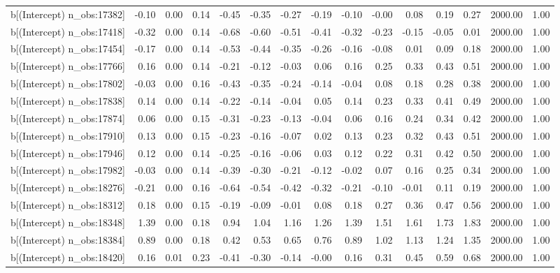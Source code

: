\begin{table}[ht]
\begin{tabular}{rrrrrrrrrrrrrrr}
  b[(Intercept) n\_obs:17382] & -0.10 & 0.00 & 0.14 & -0.45 & -0.35 & -0.27 & -0.19 & -0.10 & -0.00 & 0.08 & 0.19 & 0.27 & 2000.00 & 1.00 \\ 
  b[(Intercept) n\_obs:17418] & -0.32 & 0.00 & 0.14 & -0.68 & -0.60 & -0.51 & -0.41 & -0.32 & -0.23 & -0.15 & -0.05 & 0.01 & 2000.00 & 1.00 \\ 
  b[(Intercept) n\_obs:17454] & -0.17 & 0.00 & 0.14 & -0.53 & -0.44 & -0.35 & -0.26 & -0.16 & -0.08 & 0.01 & 0.09 & 0.18 & 2000.00 & 1.00 \\ 
  b[(Intercept) n\_obs:17766] & 0.16 & 0.00 & 0.14 & -0.21 & -0.12 & -0.03 & 0.06 & 0.16 & 0.25 & 0.33 & 0.43 & 0.51 & 2000.00 & 1.00 \\ 
  b[(Intercept) n\_obs:17802] & -0.03 & 0.00 & 0.16 & -0.43 & -0.35 & -0.24 & -0.14 & -0.04 & 0.08 & 0.18 & 0.28 & 0.38 & 2000.00 & 1.00 \\ 
  b[(Intercept) n\_obs:17838] & 0.14 & 0.00 & 0.14 & -0.22 & -0.14 & -0.04 & 0.05 & 0.14 & 0.23 & 0.33 & 0.41 & 0.49 & 2000.00 & 1.00 \\ 
  b[(Intercept) n\_obs:17874] & 0.06 & 0.00 & 0.15 & -0.31 & -0.23 & -0.13 & -0.04 & 0.06 & 0.16 & 0.24 & 0.34 & 0.42 & 2000.00 & 1.00 \\ 
  b[(Intercept) n\_obs:17910] & 0.13 & 0.00 & 0.15 & -0.23 & -0.16 & -0.07 & 0.02 & 0.13 & 0.23 & 0.32 & 0.43 & 0.51 & 2000.00 & 1.00 \\ 
  b[(Intercept) n\_obs:17946] & 0.12 & 0.00 & 0.14 & -0.25 & -0.16 & -0.06 & 0.03 & 0.12 & 0.22 & 0.31 & 0.42 & 0.50 & 2000.00 & 1.00 \\ 
  b[(Intercept) n\_obs:17982] & -0.03 & 0.00 & 0.14 & -0.39 & -0.30 & -0.21 & -0.12 & -0.02 & 0.07 & 0.16 & 0.25 & 0.34 & 2000.00 & 1.00 \\ 
  b[(Intercept) n\_obs:18276] & -0.21 & 0.00 & 0.16 & -0.64 & -0.54 & -0.42 & -0.32 & -0.21 & -0.10 & -0.01 & 0.11 & 0.19 & 2000.00 & 1.00 \\ 
  b[(Intercept) n\_obs:18312] & 0.18 & 0.00 & 0.15 & -0.19 & -0.09 & -0.01 & 0.08 & 0.18 & 0.27 & 0.36 & 0.47 & 0.56 & 2000.00 & 1.00 \\ 
  b[(Intercept) n\_obs:18348] & 1.39 & 0.00 & 0.18 & 0.94 & 1.04 & 1.16 & 1.26 & 1.39 & 1.51 & 1.61 & 1.73 & 1.83 & 2000.00 & 1.00 \\ 
  b[(Intercept) n\_obs:18384] & 0.89 & 0.00 & 0.18 & 0.42 & 0.53 & 0.65 & 0.76 & 0.89 & 1.02 & 1.13 & 1.24 & 1.35 & 2000.00 & 1.00 \\ 
  b[(Intercept) n\_obs:18420] & 0.16 & 0.01 & 0.23 & -0.41 & -0.30 & -0.14 & -0.00 & 0.16 & 0.31 & 0.45 & 0.59 & 0.68 & 2000.00 & 1.00 \\ 

\end{tabular}
\end{table}

